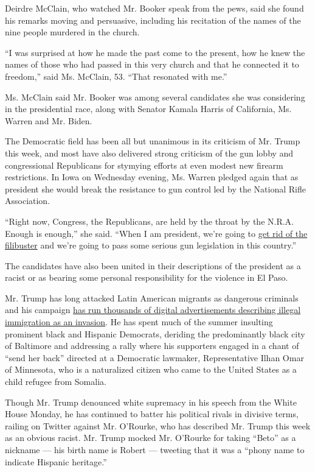 Deirdre McClain, who watched Mr. Booker speak from the pews, said she
found his remarks moving and persuasive, including his recitation of the
names of the nine people murdered in the church.

``I was surprised at how he made the past come to the present, how he
knew the names of those who had passed in this very church and that he
connected it to freedom,'' said Ms. McClain, 53. ``That resonated with
me.''

Ms. McClain said Mr. Booker was among several candidates she was
considering in the presidential race, along with Senator Kamala Harris
of California, Ms. Warren and Mr. Biden.

The Democratic field has been all but unanimous in its criticism of Mr.
Trump this week, and most have also delivered strong criticism of the
gun lobby and congressional Republicans for stymying efforts at even
modest new firearm restrictions. In Iowa on Wednesday evening, Ms.
Warren pledged again that as president she would break the resistance to
gun control led by the National Rifle Association.

``Right now, Congress, the Republicans, are held by the throat by the
N.R.A. Enough is enough,'' she said. ``When I am president, we're going
to
\href{https://www.nytimes.com/2019/07/10/us/politics/climate-change-filibuster.html}{get
rid of the filibuster} and we're going to pass some serious gun
legislation in this country.''

The candidates have also been united in their descriptions of the
president as a racist or as bearing some personal responsibility for the
violence in El Paso.

Mr. Trump has long attacked Latin American migrants as dangerous
criminals and his campaign
\href{https://www.nytimes.com/2019/08/05/us/politics/trump-campaign-facebook-ads-invasion.html}{has
run thousands of digital advertisements describing illegal immigration
as an invasion}. He has spent much of the summer insulting prominent
black and Hispanic Democrats, deriding the predominantly black city of
Baltimore and addressing a rally where his supporters engaged in a chant
of ``send her back'' directed at a Democratic lawmaker, Representative
Ilhan Omar of Minnesota, who is a naturalized citizen who came to the
United States as a child refugee from Somalia.

Though Mr. Trump denounced white supremacy in his speech from the White
House Monday, he has continued to batter his political rivals in
divisive terms, railing on Twitter against Mr. O'Rourke, who has
described Mr. Trump this week as an obvious racist. Mr. Trump mocked Mr.
O'Rourke for taking ``Beto'' as a nickname --- his birth name is Robert
--- tweeting that it was a ``phony name to indicate Hispanic heritage.''

